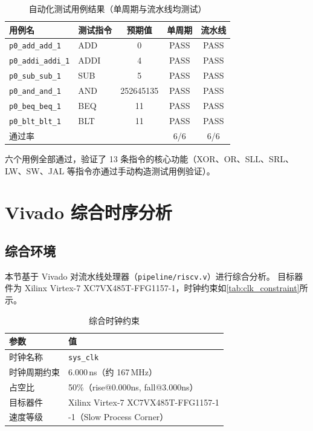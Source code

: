 \documentclass[12pt,hyperref,a4paper,UTF8]{ctexart}
\begin{document}
\begin{table}[H]
    \centering
    \caption{自动化测试用例结果（单周期与流水线均测试）}
    \label{tab:test_results}
    \begin{tabular}{llccc}
        \toprule
        用例名 & 测试指令 & 预期值 & 单周期 & 流水线 \\
        \midrule
        \texttt{p0\_add\_add\_1}   & ADD  & 0          & PASS & PASS \\
        \texttt{p0\_addi\_addi\_1} & ADDI & 4          & PASS & PASS \\
        \texttt{p0\_sub\_sub\_1}   & SUB  & 5          & PASS & PASS \\
        \texttt{p0\_and\_and\_1}   & AND  & 252645135  & PASS & PASS \\
        \texttt{p0\_beq\_beq\_1}   & BEQ  & 11         & PASS & PASS \\
        \texttt{p0\_blt\_blt\_1}   & BLT  & 11         & PASS & PASS \\
        \midrule
        \multicolumn{3}{l}{通过率} & 6/6 & 6/6 \\
        \bottomrule
    \end{tabular}
\end{table}

六个用例全部通过，验证了 13 条指令的核心功能（XOR、OR、SLL、SRL、LW、SW、JAL 等指令亦通过手动构造测试用例验证）。

\section{Vivado 综合时序分析}

\subsection{综合环境}

本节基于 Vivado 对流水线处理器（\texttt{pipeline/riscv.v}）进行综合分析。
目标器件为 Xilinx Virtex-7 XC7VX485T-FFG1157-1，时钟约束如\autoref{tab:clk_constraint}所示。

\begin{table}[H]
    \centering
    \caption{综合时钟约束}
    \label{tab:clk_constraint}
    \begin{tabular}{ll}
        \toprule
        参数 & 值 \\
        \midrule
        时钟名称 & \texttt{sys\_clk} \\
        时钟周期约束 & 6.000\,ns（约 167\,MHz） \\
        占空比 & 50\%（rise@0.000ns, fall@3.000ns） \\
        目标器件 & Xilinx Virtex-7 XC7VX485T-FFG1157-1 \\
        速度等级 & -1（Slow Process Corner） \\
        \bottomrule
    \end{tabular}
\end{table}
\end{document}

